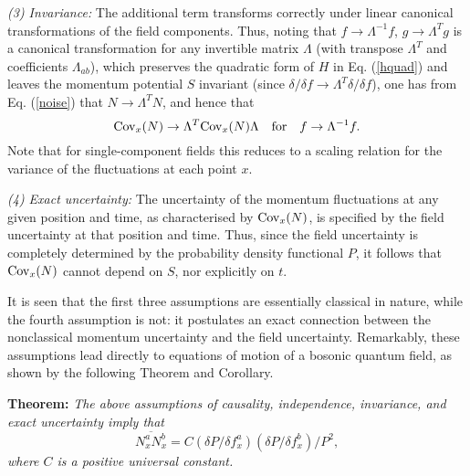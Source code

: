\documentclass[a4paper,preprint, showpacs, aps, draft]{revtex4}
\begin{document}
{{\it (3) Invariance:} The additional term transforms correctly under
linear canonical transformations of the field components.  Thus, noting 
that $f\rightarrow\Lambda^{-1}f$, $g\rightarrow\Lambda^Tg$ is a
canonical transformation for any invertible matrix $\Lambda$ (with
transpose $\Lambda^T$ and  
coefficients $\Lambda_{ab}$), which preserves the quadratic form of $H$
in Eq. (\ref{hquad}) and leaves the momentum potential $S$ invariant (since
$\delta/\delta f\rightarrow \Lambda^T\delta/\delta f$), one has from 
Eq. (\ref{noise}) that
$N\rightarrow\Lambda^TN$, and hence that
\[ {\rm Cov}_x(N) \rightarrow \Lambda^T {\rm Cov}_x(N)\Lambda ~~~{\rm for}
~~~f\rightarrow\Lambda^{-1}f .\]
Note that for single-component fields this reduces to a scaling relation
for the variance of the fluctuations at each point $x$.
  
{\it (4) Exact uncertainty:} The uncertainty of the momentum
fluctuations at any given position and time, as characterised by ${\rm
Cov}_x(N)$, is specified by the field uncertainty at that position and
time.  Thus, since the field uncertainty is completely determined by the
probability density functional $P$, it follows that ${\rm Cov}_x(N)$
cannot depend on $S$, nor explicitly on $t$. 

It is seen that the first three assumptions are essentially 
classical in nature, 
while the fourth assumption is not: it postulates an exact connection
between the nonclassical momentum uncertainty and the field uncertainty.   
Remarkably, these assumptions lead
directly to equations of motion of a bosonic quantum field, as shown by
the following Theorem and Corollary.

{\bf Theorem:}  {\it The above assumptions of causality, independence,
invariance, and 
exact uncertainty imply that} 
\begin{equation} \label{theorem}
\overline{N^a_xN^b_x} = C (\delta P/\delta f^a_x) (\delta P/\delta
f^b_x)/P^2 ,
\end{equation}
{\it where $C$ is a positive universal constant.}  

}
\end{document}
